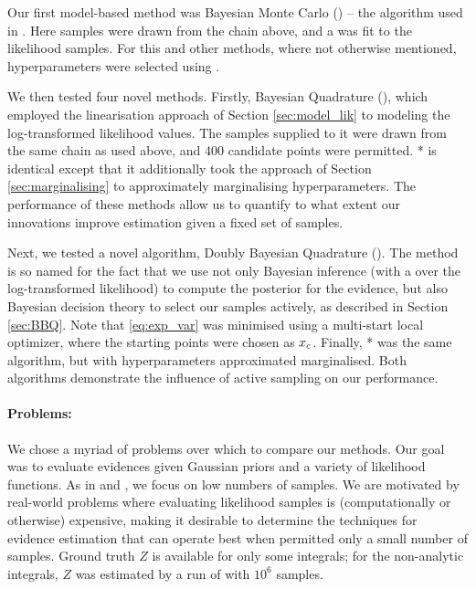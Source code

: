 \documentclass{article}
\begin{document}

Our first model-based method was Bayesian Monte Carlo () -- the algorithm used in \citep{BZMonteCarlo}. Here samples were drawn from the  chain above, and a \gpb was fit to the likelihood samples. For this and other methods, where not otherwise mentioned, \gpb hyperparameters were selected using . 

We then tested four novel methods. Firstly, Bayesian Quadrature (), which employed the linearisation approach of Section \ref{sec:model_lik} to modeling the log-transformed likelihood values. The samples supplied to it were drawn from the same  chain as used above, and 400 candidate points were permitted. * is identical except that it additionally took the approach of Section \ref{sec:marginalising} to approximately marginalising hyperparameters. The performance of these methods allow us to quantify to what extent our innovations improve estimation given a fixed set of samples. 

Next, we tested a novel algorithm, Doubly Bayesian Quadrature (). The method is so named for the fact that we use not only Bayesian inference (with a \gpb over the log-transformed likelihood) to compute the posterior for the evidence, but also Bayesian decision theory to select our samples actively, as described in Section \ref{sec:BBQ}. Note that \eqref{eq:exp_var} was minimised using a multi-start local optimizer, where the starting points were chosen as $\lfv_c$. Finally, * was the same algorithm, but with hyperparameters  approximated marginalised. Both algorithms demonstrate the influence of active sampling on our performance. 

\paragraph{Problems:}
We chose a myriad of problems over which to compare our methods. Our goal was to evaluate evidences given Gaussian priors and a variety of likelihood functions. As in \citet{BZMonteCarlo} and \citet{BQR}, we focus on low numbers of samples. We are motivated by real-world problems where evaluating likelihood samples is (computationally or otherwise) expensive, making it desirable to determine the techniques for evidence estimation that can operate best when permitted only a small number of samples. Ground truth $Z$ is available for only some integrals; for the non-analytic integrals, $Z$ was estimated by a run of  with $10^6$ samples.
\end{document}
